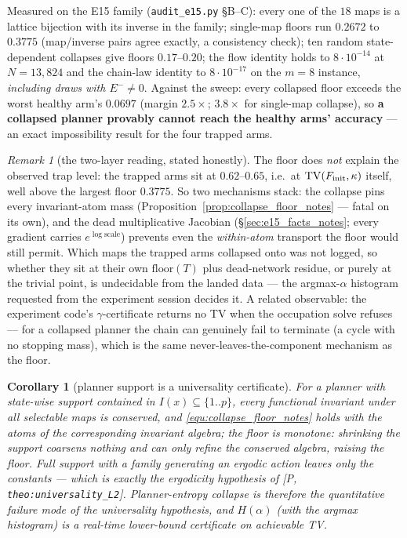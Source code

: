 \documentclass[11pt]{article}
\newtheorem{corollary}[theorem]{Corollary}
\theoremstyle{definition}
\theoremstyle{remark}
\newtheorem{remark}[theorem]{Remark}
\newcommand{\paperref}[1]{[P,\,\texttt{#1}]}   %
\begin{document}
Measured on the E15 family (\texttt{audit\_e15.py} \S B--C): every one of the $18$ maps
is a lattice bijection with its inverse in the family; single-map floors run
$\mathbf{0.2672}$ to $\mathbf{0.3775}$ (map/inverse pairs agree exactly, a consistency
check); ten random state-dependent collapses give floors $0.17$--$0.20$; the flow
identity holds to $8\cdot10^{-14}$ at $N=13{,}824$ and the chain-law identity to
$8\cdot10^{-17}$ on the $m=8$ instance, \emph{including draws with
$E^-\neq0$}. Against the sweep: every collapsed floor exceeds the worst healthy arm's
$0.0697$ (margin $2.5\times$; $3.8\times$ for single-map collapse), so
\textbf{a collapsed planner provably cannot reach the healthy arms' accuracy} --- an
exact impossibility result for the four trapped arms.

\begin{remark}[the two-layer reading, stated honestly]\label{rem:two_layer_notes}
The floor does \emph{not} explain the observed trap level: the trapped arms sit at
$0.62$--$0.65$, i.e.\ at $\mathrm{TV}(F_{\mathrm{init}},\kappa)$ itself, well above the largest floor
$0.3775$. So two mechanisms stack: the collapse pins every invariant-atom mass
(Proposition~\ref{prop:collapse_floor_notes} --- fatal on its own), and the dead multiplicative
Jacobian (\S\ref{sec:e15_facts_notes}; every gradient carries $e^{\log\mathrm{scale}}$)
prevents even the \emph{within-atom} transport the floor would still permit. Which maps
the trapped arms collapsed onto was not logged, so whether they sit at their own
$\mathrm{floor}(T)$ plus dead-network residue, or purely at the trivial point, is
undecidable from the landed data --- the argmax-$\alpha$ histogram requested from the
experiment session decides it. A related observable: the experiment code's
$\gamma$-certificate returns no TV when the occupation solve refuses --- for a collapsed
planner the chain can genuinely fail to terminate (a cycle with no stopping mass), which
is the same never-leaves-the-component mechanism as the floor.
\end{remark}

\begin{corollary}[planner support is a universality certificate]\label{cor:planner_support_notes}
For a planner with state-wise support contained in $I(x)\subseteq\{1..p\}$, every
functional invariant under \emph{all} selectable maps is conserved, and
\eqref{equ:collapse_floor_notes} holds with the atoms of the corresponding invariant algebra;
the floor is monotone: shrinking the support coarsens nothing and can only refine the
conserved algebra, raising the floor. Full support with a family generating an ergodic
action leaves only the constants --- which is exactly the ergodicity hypothesis of
\paperref{theo:universality\_L2}. Planner-entropy collapse is therefore the
\emph{quantitative failure mode of the universality hypothesis}, and $H(\alpha)$ (with
the argmax histogram) is a real-time lower-bound certificate on achievable TV.
\end{corollary}
\end{document}
